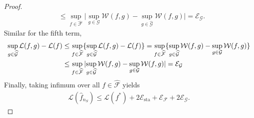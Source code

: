 \begin{proof}
\begin{align*}
        &\leq \sup_{f \in \widehat{\mathcal{F}}}\big\vert\sup_{g \in \mathcal{G}}\mathcal{W}(f, g) - \sup_{g \in \widehat{\mathcal{G}}}\mathcal{W}(f, g)\big\vert = \mathcal{E}_{\mathcal{G}}.
    \end{align*}
    Similar for the fifth term, 
    \begin{align*}
        \sup_{g \in \widehat{\mathcal{G}}}\mathcal{L}(f, g) - \mathcal{L}(f) &\leq \sup_{f \in \widehat{\mathcal{F}}}\{\sup_{g \in \widehat{\mathcal{G}}}\mathcal{L}(f,g) - \mathcal{L}(f)\} = \sup_{f \in \widehat{\mathcal{F}}}\{\sup_{g \in \widehat{\mathcal{G}}}\mathcal{W}(f,g) - \sup_{g \in \mathcal{G}}\mathcal{W}(f,g)\} \\
        &\leq \sup_{f \in \widehat{\mathcal{F}}}\vert{\sup_{g \in \widehat{\mathcal{G}}}\mathcal{W}(f,g) - \sup_{g \in \mathcal{G}}\mathcal{W}(f,g)}\vert = \mathcal{E}_{\mathcal{G}}
    \end{align*}
    Finally, taking infimum over all $f \in \widehat{\mathcal{F}}$ yields
    \begin{align*}
        \mathcal{L}(\hat{f}_{n_S}) \leq \mathcal{L}(f^*) + 2\mathcal{E}_{\mathrm{sta}} + \mathcal{E}_{\mathcal{F}} + 2\mathcal{E}_{\mathcal{G}}.
    \end{align*}
\end{proof}

